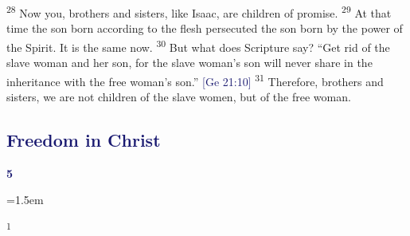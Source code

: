 \documentclass[12pt,twoside]{article}
\newcommand{\vs}[1]{\textsuperscript{#1}}
\newcommand{\chapterWithIndent}[2]{%
  \noindent
  \begin{minipage}[t]{1cm}
    \vspace{-0.4\baselineskip}
    {\textcolor{MidnightBlue}{\fontsize{40pt}{48pt}\selectfont \textbf{#1}}}
  \end{minipage}%
  \hspace{0.3cm}%
  \begin{minipage}[t]{\dimexpr\linewidth - 1.5cm - 0.3cm\relax}
    \hangindent=1.5em
    \hangafter=3
    #2
    \vspace{0.05cm}
  \end{minipage}
}
\begin{document}
 \vs{28} Now you, brothers and sisters, like Isaac, are children of promise.
 \vs{29} At that time the son born according to the flesh persecuted the son born by the power of the Spirit. It is the same now.
 \vs{30} But what does Scripture say? ``Get rid of the slave woman and her son, for the slave woman's son will never share in the inheritance with the free woman's son.'' {\fontsize{8pt}{5pt}\selectfont\textcolor{MidnightBlue}{[Ge 21:10]}}
 \vs{31} Therefore, brothers and sisters, we are not children of the slave women, but of the free woman.

 \subsection*{\textcolor{MidnightBlue}{\textbf{Freedom in Christ}}}

 \chapterWithIndent{5}{
    \vs{1}
 }
\end{document}
